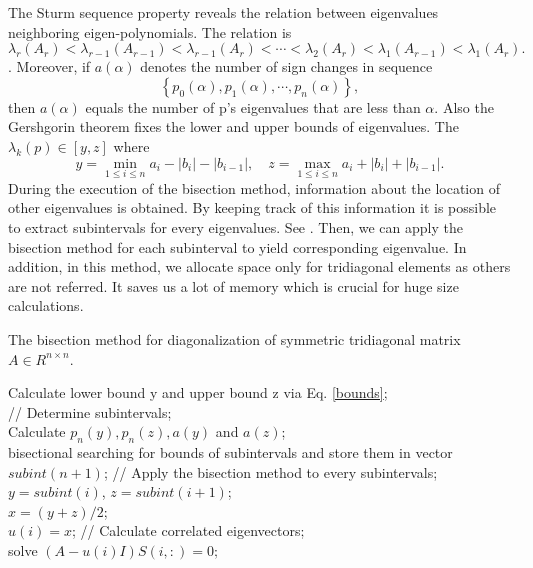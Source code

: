 The Sturm sequence property\cite{golub2012matrix} reveals the relation between eigenvalues neighboring eigen-polynomials. 
	The relation is 
\begin{equation}
	\lambda_r(A_r)<\lambda_{r-1}(A
	_{r-1})<\lambda_{r-1}(A
	_{r})<\cdots<\lambda_2(A
	_{r})<\lambda_{1}(A_
	{r-1})<\lambda_{1}(A_{r}).
\end{equation}.
Moreover, if $a(\alpha)$ denotes the number of sign changes in sequence
\[
	\left\{p_0(\alpha),p_1(\alpha),\cdots,p_n(\alpha)\right\},
\]
then $a(\alpha)$ equals the number of p's eigenvalues that are less than $\alpha$. 
Also the Gershgorin theorem fixes the lower and upper bounds of eigenvalues. 
The $\lambda_k(p)\in[y,z]$ where
\begin{equation}\label{bounds}
	y = \min_{1\le i \le n}a_i - |b_i| -|b_{i-1}|,\quad z = \max_{1\le i \le n}a_i + |b_i| + |b_{i-1}|.
\end{equation}
During the execution of the bisection method, information about the location of other eigenvalues is obtained.
By keeping track of this information it is possible to extract subintervals for every eigenvalues. 
See \cite{wilkinson1962calculation}.
Then, we can apply the bisection method for each subinterval to yield corresponding eigenvalue. 
In addition, in this method, we allocate space only for tridiagonal elements as others are not referred. 
It saves us a lot of memory which is crucial for huge size  calculations.
\begin{algorithm}[tb]
	\label{BisectionAlgo}
	\caption{The bisection method for diagonalization of symmetric tridiagonal matrix $A\in R^{n\times n}$. }
	Calculate lower bound y and upper bound z
	via Eq. \ref{bounds};\\
	// Determine subintervals;\\
	Calculate $p_n(y), p_n(z), a(y)$ and $a(z)$;\\
    {
		bisectional searching for bounds of subintervals and store them in vector $subint(n+1)$;
    }
    // Apply the bisection method to every subintervals;\\ 
	{
	$y = subint(i)$, $z = subint(i+1)$;\\
    {
		$x=(y+z)/2$;\\
    }
    $u(i) = x$;
    }
    // Calculate correlated eigenvectors;\\
    {
    solve $(A-u(i)I)S(i,:) = 0;$
    }
\end{algorithm}
